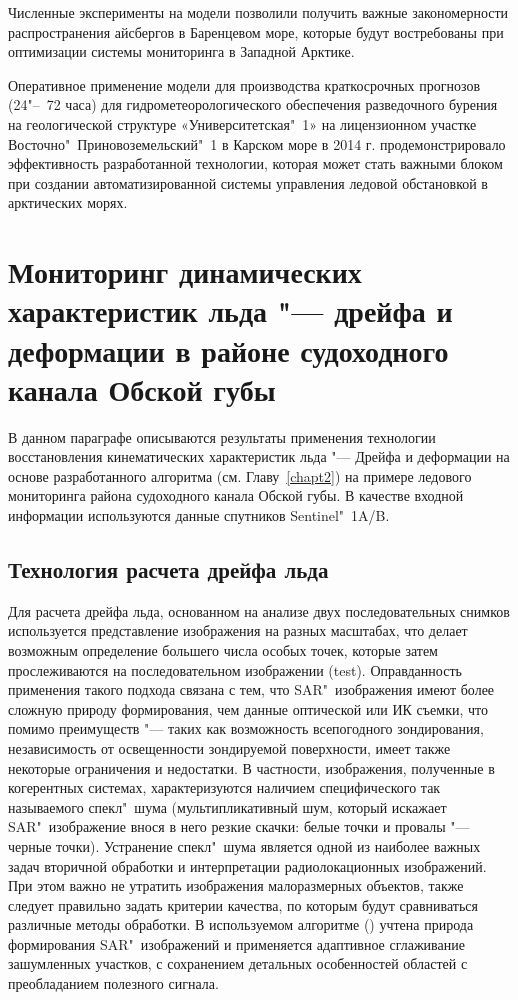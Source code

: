 Численные эксперименты на модели позволили получить важные закономерности распространения айсбергов в Баренцевом море, которые будут востребованы при оптимизации системы мониторинга в Западной Арктике.

Оперативное применение модели для производства краткосрочных прогнозов (24"--~72 часа) для гидрометеорологического обеспечения разведочного бурения на геологической структуре «Университетская"~1» на лицензионном участке Восточно"~Приновоземельский"~1 в Карском море в 2014 г. продемонстрировало эффективность разработанной технологии, которая может стать важными блоком при создании автоматизированной системы управления ледовой обстановкой в арктических морях.

\newpage

\section{Мониторинг динамических характеристик льда "--- дрейфа и деформации в районе судоходного канала Обской губы} \label{sect4_2}

В данном параграфе описываются результаты применения технологии восстановления кинематических характеристик льда "--- Дрейфа и деформации на основе разработанного алгоритма (см. Главу~\ref{chapt2}) на примере ледового мониторинга района судоходного канала Обской губы. В качестве входной информации используются данные спутников Sentinel"~1A/B.

\subsection{Технология расчета дрейфа льда} \label{subsect4_2_1}

Для расчета дрейфа льда, основанном на анализе двух последовательных снимков используется представление изображения на разных масштабах, что делает возможным определение большего числа особых точек, которые затем прослеживаются на последовательном изображении (test). Оправданность применения такого подхода связана с тем, что SAR"~изображения имеют более сложную природу формирования, чем данные оптической или ИК съемки, что помимо преимуществ "--- таких как возможность всепогодного зондирования, независимость от освещенности зондируемой поверхности, имеет также некоторые ограничения и недостатки. В частности, изображения, полученные в когерентных системах, характеризуются наличием специфического так называемого спекл"~шума (мультипликативный шум, который искажает SAR"~изображение внося в него резкие скачки: белые точки и провалы "--- черные точки). Устранение спекл"~шума является одной из наиболее важных задач вторичной обработки и интерпретации радиолокационных изображений. При этом важно не утратить изображения малоразмерных объектов, также следует правильно задать критерии качества, по которым будут сравниваться различные методы обработки. В используемом алгоритме () учтена природа формирования SAR"~изображений и применяется адаптивное сглаживание зашумленных участков, с сохранением детальных особенностей областей с преобладанием полезного сигнала.

